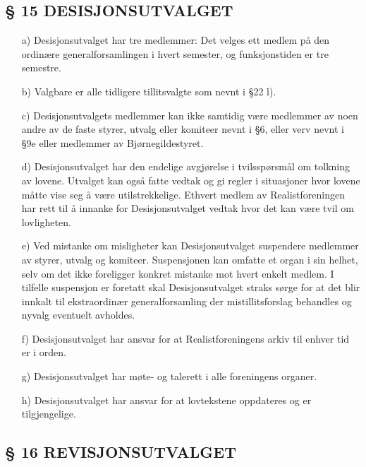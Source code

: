 \subsection*{§ 15 DESISJONSUTVALGET}

\begin{itemize}
\item[a)] Desisjonsutvalget har tre medlemmer: Det velges ett medlem på den
ordinære generalforsamlingen i hvert semester, og funksjonstiden er
tre semestre.

\item[b)] Valgbare er alle tidligere tillitsvalgte som nevnt i §22 l).

\item[c)] Desisjonsutvalgets medlemmer kan ikke samtidig være medlemmer av
noen andre av de faste styrer, utvalg eller komiteer nevnt i §6, eller
verv nevnt i §9e eller medlemmer av Bjørnegildestyret.

\item[d)] Desisjonsutvalget har den endelige avgjørelse i tvilsspørsmål om
tolkning av lovene. Utvalget kan også fatte vedtak og gi regler i
situasjoner hvor lovene måtte vise seg å være utilstrekkelige. Ethvert
medlem av Realistforeningen har rett til å innanke for
Desisjonsutvalget vedtak hvor det kan være tvil om lovligheten.

\item[e)] Ved mistanke om misligheter kan Desisjonsutvalget suspendere
medlemmer av styrer, utvalg og komiteer. Suspensjonen kan omfatte et
organ i sin helhet, selv om det ikke foreligger konkret mistanke mot
hvert enkelt medlem.  I tilfelle suspensjon er foretatt skal
Desisjonsutvalget straks sørge for at det blir innkalt til
ekstraordinær generalforsamling der mistillitsforslag behandles og
nyvalg eventuelt avholdes.

\item[f)] Desisjonsutvalget har ansvar for at Realistforeningens arkiv til
enhver tid er i orden.
        
\item[g)] Desisjonsutvalget har møte- og talerett i alle foreningens organer. 

\item[h)] Desisjonsutvalget har ansvar for at lovtekstene oppdateres og er tilgjengelige.
\end{itemize}


\subsection*{§ 16 REVISJONSUTVALGET}

